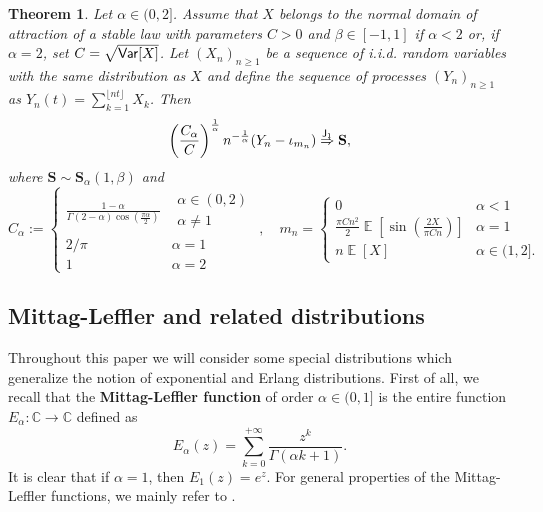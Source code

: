 \documentclass[]{amsart}
\numberwithin{equation}{section}
\newtheorem{thm}{Theorem}[section]
\theoremstyle{remark}
\theoremstyle{definition}
\DeclareMathOperator{\E}{\mathbb{E}}
\begin{document}
\begin{thm}\label{thm:DTa}
	Let $\alpha \in (0,2]$. Assume that $X$ belongs to the normal domain of attraction of a stable law with parameters $C>0$ and $\beta \in [-1,1]$ if $\alpha<2$ or, if $\alpha=2$, set $C=\sqrt{{\sf Var}[X]}$. Let $(X_n)_{n \ge 1}$ be a sequence of i.i.d. random variables with the same distribution as $X$ and define the sequence of processes $(Y_n)_{n \ge 1}$ as  $Y_n(t)=\sum_{k=1}^{\lfloor nt \rfloor}X_k$. Then
	\begin{equation*}
		\left(\frac{C_\alpha}{C}\right)^{\frac{1}{\alpha}}n^{-\frac{1}{\alpha}}(Y_n-\iota_{m_n}) \overset{{\sf J}_1}{\Rightarrow} \mathbf{S},
	\end{equation*}
	where $\mathbf{S} \sim \mathbf{S}_\alpha(1,\beta)$ and
	\begin{equation}\label{eq:Ca}
		C_\alpha:=\begin{cases}
			\displaystyle \frac{1-\alpha}{\Gamma(2-\alpha)\cos\left(\frac{\pi \alpha}{2}\right)} & \displaystyle\substack{\alpha \in (0,2) \\ \alpha \not = 1} \\[7pt]
			\displaystyle 2/\pi & \alpha=1\\
			1 & \alpha=2
		\end{cases},
		\quad m_n=\begin{cases}
			0 & \alpha<1 \\[7pt]
			\displaystyle \frac{\pi Cn^{2}}{2}\E\left[\sin\left(\frac{2X}{\pi Cn}\right)\right] & \alpha=1 \\[7pt]
			n\E[X] & \alpha \in (1,2].
		\end{cases}
	\end{equation}
\end{thm}
\subsection{Mittag-Leffler and related distributions}\label{sec:ML}
Throughout this paper we will consider some special distributions which generalize the notion of exponential and Erlang distributions. First of all, we recall that the \textbf{Mittag-Leffler function} of order $\alpha \in (0,1]$ is the entire function $E_\alpha: \mathbb{C} \to \mathbb{C}$ defined as
\begin{equation*}
	E_\alpha(z)=\sum_{k=0}^{+\infty}\frac{z^k}{\Gamma(\alpha k+1)}.
\end{equation*}
It is clear that if $\alpha=1$, then $E_1(z)=e^z$. For general properties of the Mittag-Leffler functions, we mainly refer to \cite{gorenflo2020mittag}. 
\end{document}

